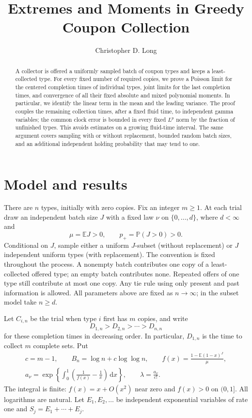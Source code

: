 \documentclass[11pt]{article}
\title{Extremes and Moments in Greedy Coupon Collection}
\author{Christopher D. Long}
\date{}
\theoremstyle{remark}\newtheorem{remark}[theorem]{Remark}
\newcommand{\Pbb}{\mathbb P}
\newcommand{\Ebb}{\mathbb E}
\newcommand{\dd}{\,\mathrm d}
\begin{document}
\maketitle
\begin{abstract}
A collector is offered a uniformly sampled batch of coupon types and keeps a
least-collected type. For every fixed number of required copies, we prove a
Poisson limit for the centered completion times of individual types, joint
limits for the last completion times, and convergence of all their fixed
absolute and mixed polynomial moments. In particular, we identify the linear
term in the mean and the leading variance. The proof couples the remaining
collection times, after a fixed fluid time, to independent gamma variables;
the common clock error is bounded in every fixed $L^p$ norm by the fraction
of unfinished types. This avoids estimates on a growing fluid-time interval.
The same argument covers sampling with or without replacement, bounded random
batch sizes, and an additional independent holding probability that may tend
to one.
\end{abstract}

\section{Model and results}
There are $n$ types, initially with zero copies. Fix an integer $m\ge1$.
At each trial draw an independent batch size $J$ with a fixed law $\nu$ on
$\{0,\ldots,d\}$, where $d<\infty$ and
\[
 \mu=\Ebb J>0,\qquad p_+=\Pbb(J>0)>0.
\]
Conditional on $J$, sample either a uniform $J$-subset (without replacement)
or $J$ independent uniform types (with replacement). The convention is fixed
throughout the process. A nonempty batch contributes one copy of a
least-collected offered type; an empty batch contributes none. Repeated
offers of one type still contribute at most one copy. Any tie rule using only
present and past information is allowed. All parameters above are fixed as
$n\to\infty$; in the subset model take $n\ge d$.

Let $C_{i,n}$ be the trial when type $i$ first has $m$ copies, and write
\[
 D_{1,n}>D_{2,n}>\cdots>D_{n,n}
\]
for these completion times in decreasing order. In particular, $D_{1,n}$ is
the time to collect $m$ complete sets. Put
\begin{equation}\label{eq:constants}
\begin{gathered}
 c=m-1,\qquad B_n=\log n+c\log\log n,\qquad
 f(x)=\frac{1-\Ebb(1-x)^J}{\mu},\\
 a_\nu=\exp\left\{\int_0^1\left(\frac1{f(x)}-\frac1x\right)\dd x\right\},
 \qquad \lambda=\frac{a_\nu}{c!}.
\end{gathered}
\end{equation}
The integral is finite: $f(x)=x+O(x^2)$ near zero and $f(x)>0$ on $(0,1]$.
All logarithms are natural. Let $E_1,E_2,\ldots$ be independent exponential
variables of rate one and $S_j=E_1+\cdots+E_j$.
\end{document}
